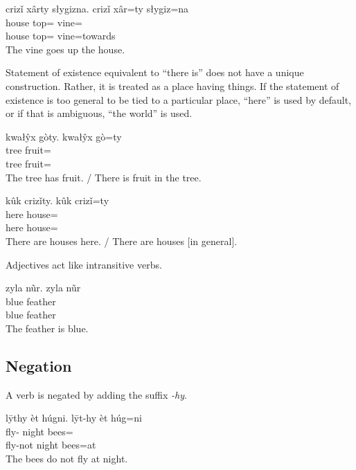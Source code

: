 \begin{exe}
    \ex
    \glt
    crizǐ xârty słygizna.
    \glll
    crizǐ xâr=ty słygiz=na \\
    house top=\Poss{} vine=\AdessTwo{} \\
    house top=\Poss{} vine=towards \\
    \glt
    The vine goes up the house.
\end{exe}

Statement of existence equivalent to ``there is''
does not have a unique construction.
Rather, it is treated as a place having things.
If the statement of existence is too general
to be tied to a particular place,
``here'' is used by default,
or if that is ambiguous,
``the world'' is used.

\begin{exe}
    \ex
    \glt
    kwałŷx gòty.
    \glll
    kwałŷx gò=ty \\
    tree fruit=\Poss{} \\
    tree fruit=\Poss{} \\
    \glt
    The tree has fruit.
    /
    There is fruit in the tree.
\end{exe}

\begin{exe}
    \ex
    \glt
    kûk crizǐty.
    \glll
    kûk crizǐ=ty \\
    here house=\Poss{} \\
    here house=\Poss{} \\
    \glt
    There are houses here.
    /
    There are houses [in general].
\end{exe}

Adjectives act like intransitive verbs.

\begin{exe}
    \ex
    \glt
    zyla nũr.
    \glll
    zyla nũr \\
    blue feather \\
    blue feather \\
    \glt
    The feather is blue.
\end{exe}

\subsection{Negation}\label{subsec:negation}
A verb is negated by adding the suffix \textit{-hy}.

\begin{exe}
    \ex
    \glt
    lȳthy èt húgni.
    \glll
    lȳt-hy èt húg=ni \\
    fly-\Neg{} night bees=\InessTwo{} \\
    fly-not night bees=at \\
    \glt
    The bees do not fly at night.
\end{exe}

